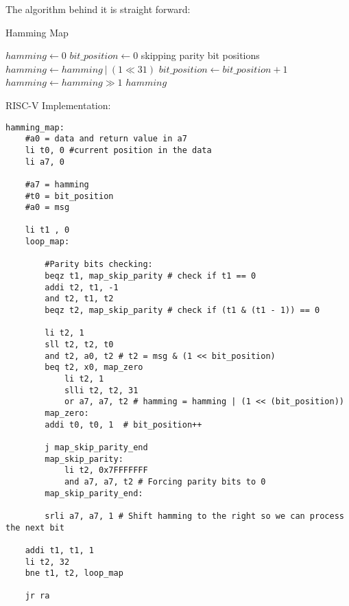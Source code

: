 \documentclass[11pt]{article}
\begin{document}
The algorithm behind it is straight forward:
\begin{algorithm}[H]
\caption{Hamming Map}
\begin{algorithmic}[1]
    \State $hamming \gets 0$
    \State $bit\_position \gets 0$
        \Comment skipping parity bit positions
                \State $hamming \gets hamming \ | \ (1 \ll 31)$
            \EndIf
            \State $bit\_position \gets bit\_position + 1$
        \EndIf
        \State $hamming \gets hamming \gg 1$
    \EndFor
    \State \Return $hamming$
\EndFunction
\end{algorithmic}
\end{algorithm}

RISC-V Implementation: 

\begin{lstlisting}[language=RISC-V]
hamming_map:
    #a0 = data and return value in a7
    li t0, 0 #current position in the data
    li a7, 0  

    #a7 = hamming 
    #t0 = bit_position
    #a0 = msg 

    li t1 , 0
    loop_map: 
        
        #Parity bits checking:
        beqz t1, map_skip_parity # check if t1 == 0
        addi t2, t1, -1
        and t2, t1, t2
        beqz t2, map_skip_parity # check if (t1 & (t1 - 1)) == 0
        
        li t2, 1
        sll t2, t2, t0
        and t2, a0, t2 # t2 = msg & (1 << bit_position)
        beq t2, x0, map_zero
            li t2, 1  
            slli t2, t2, 31
            or a7, a7, t2 # hamming = hamming | (1 << (bit_position))
        map_zero: 
        addi t0, t0, 1  # bit_position++

        j map_skip_parity_end
        map_skip_parity: 
            li t2, 0x7FFFFFFF 
            and a7, a7, t2 # Forcing parity bits to 0
        map_skip_parity_end:

        srli a7, a7, 1 # Shift hamming to the right so we can process the next bit 
        
    addi t1, t1, 1 
    li t2, 32
    bne t1, t2, loop_map

    jr ra
\end{lstlisting}
\end{document}
